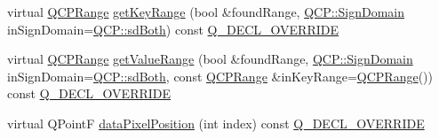 \begin{DoxyCompactItemize}
\item 
virtual \hyperlink{class_q_c_p_range}{Q\+C\+P\+Range} \hyperlink{class_q_c_p_bars_ac5a3854774d9d9cd129b1eae1426de2d}{get\+Key\+Range} (bool \&found\+Range, \hyperlink{namespace_q_c_p_afd50e7cf431af385614987d8553ff8a9}{Q\+C\+P\+::\+Sign\+Domain} in\+Sign\+Domain=\hyperlink{namespace_q_c_p_afd50e7cf431af385614987d8553ff8a9aa38352ef02d51ddfa4399d9551566e24}{Q\+C\+P\+::sd\+Both}) const \hyperlink{qcustomplot_8h_a42cc5eaeb25b85f8b52d2a4b94c56f55}{Q\+\_\+\+D\+E\+C\+L\+\_\+\+O\+V\+E\+R\+R\+I\+DE}
\item 
virtual \hyperlink{class_q_c_p_range}{Q\+C\+P\+Range} \hyperlink{class_q_c_p_bars_a02cee4bf94d48a1e5f6fc185d9a10477}{get\+Value\+Range} (bool \&found\+Range, \hyperlink{namespace_q_c_p_afd50e7cf431af385614987d8553ff8a9}{Q\+C\+P\+::\+Sign\+Domain} in\+Sign\+Domain=\hyperlink{namespace_q_c_p_afd50e7cf431af385614987d8553ff8a9aa38352ef02d51ddfa4399d9551566e24}{Q\+C\+P\+::sd\+Both}, const \hyperlink{class_q_c_p_range}{Q\+C\+P\+Range} \&in\+Key\+Range=\hyperlink{class_q_c_p_range}{Q\+C\+P\+Range}()) const \hyperlink{qcustomplot_8h_a42cc5eaeb25b85f8b52d2a4b94c56f55}{Q\+\_\+\+D\+E\+C\+L\+\_\+\+O\+V\+E\+R\+R\+I\+DE}
\item 
virtual Q\+PointF \hyperlink{class_q_c_p_bars_a55cdaf565cd3384158d1f7f89533bc2d}{data\+Pixel\+Position} (int index) const \hyperlink{qcustomplot_8h_a42cc5eaeb25b85f8b52d2a4b94c56f55}{Q\+\_\+\+D\+E\+C\+L\+\_\+\+O\+V\+E\+R\+R\+I\+DE}
\end{DoxyCompactItemize}
